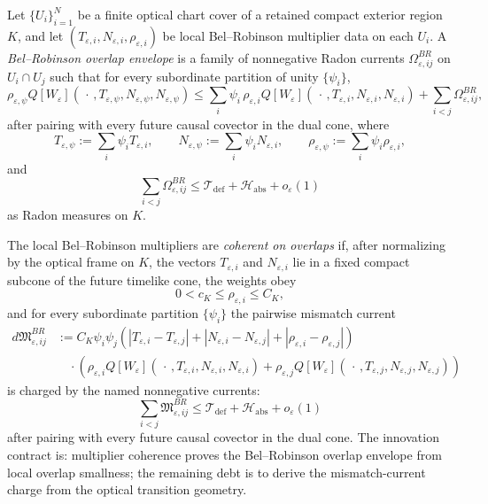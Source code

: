 \begin{definition}\label{def:BelRobinsonOverlapEnvelope}
Let $\{U_i\}_{i=1}^N$ be a finite optical chart cover of a retained compact exterior region $K$, and let $(T_{\varepsilon,i},N_{\varepsilon,i},\rho_{\varepsilon,i})$ be local Bel--Robinson multiplier data on each $U_i$. A \emph{Bel--Robinson overlap envelope} is a family of nonnegative Radon currents $\Omega^{BR}_{\varepsilon,ij}$ on $U_i\cap U_j$ such that for every subordinate partition of unity $\{\psi_i\}$,
\[
    \rho_{\varepsilon,\psi}
    Q[W_\varepsilon]\!\left(\,\cdot\,,T_{\varepsilon,\psi},N_{\varepsilon,\psi},N_{\varepsilon,\psi}\right)
    \le
    \sum_i \psi_i\,\rho_{\varepsilon,i}Q[W_\varepsilon](\,\cdot\,,T_{\varepsilon,i},N_{\varepsilon,i},N_{\varepsilon,i})
    +
    \sum_{i<j}\Omega^{BR}_{\varepsilon,ij},
\]
after pairing with every future causal covector in the dual cone, where
\[
    T_{\varepsilon,\psi}:=\sum_i\psi_iT_{\varepsilon,i},
    \qquad
    N_{\varepsilon,\psi}:=\sum_i\psi_iN_{\varepsilon,i},
    \qquad
    \rho_{\varepsilon,\psi}:=\sum_i\psi_i\rho_{\varepsilon,i},
\]
and
\[
    \sum_{i<j}\Omega^{BR}_{\varepsilon,ij}
    \le
    \mathcal T_{\mathrm{def}}+\mathcal H_{\mathrm{abs}}+o_\varepsilon(1)
\]
as Radon measures on $K$.
\end{definition}

\begin{definition}\label{def:BelRobinsonMultiplierCoherence}
The local Bel--Robinson multipliers are \emph{coherent on overlaps} if, after normalizing by the optical frame on $K$, the vectors $T_{\varepsilon,i}$ and $N_{\varepsilon,i}$ lie in a fixed compact subcone of the future timelike cone, the weights obey
\[
    0<c_K\le \rho_{\varepsilon,i}\le C_K,
\]
and for every subordinate partition $\{\psi_i\}$ the pairwise mismatch current
\[
\begin{split}
    d\mathfrak M^{BR}_{\varepsilon,ij}
    &:=
    C_K\psi_i\psi_j
    \left(
        |T_{\varepsilon,i}-T_{\varepsilon,j}|
        +
        |N_{\varepsilon,i}-N_{\varepsilon,j}|
        +
        |\rho_{\varepsilon,i}-\rho_{\varepsilon,j}|
    \right) \\
    &\quad\cdot
    \left(
        \rho_{\varepsilon,i}Q[W_\varepsilon](\,\cdot\,,T_{\varepsilon,i},N_{\varepsilon,i},N_{\varepsilon,i})
        +
        \rho_{\varepsilon,j}Q[W_\varepsilon](\,\cdot\,,T_{\varepsilon,j},N_{\varepsilon,j},N_{\varepsilon,j})
    \right)
\end{split}
\]
is charged by the named nonnegative currents:
\[
    \sum_{i<j}\mathfrak M^{BR}_{\varepsilon,ij}
    \le
    \mathcal T_{\mathrm{def}}+\mathcal H_{\mathrm{abs}}+o_\varepsilon(1)
\]
after pairing with every future causal covector in the dual cone. The innovation contract is: multiplier coherence proves the Bel--Robinson overlap envelope from local overlap smallness; the remaining debt is to derive the mismatch-current charge from the optical transition geometry.
\end{definition}

